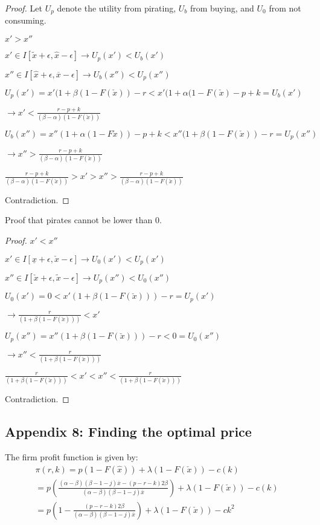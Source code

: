 \documentclass{article}
\begin{document}
\begin{proof}
Let $U_p$ denote the utility from pirating, $U_b$ from buying, and $U_0$ from not consuming.

$x'>x''$

$x' \in I[\tilde{x}+\epsilon,\hat{x}-\epsilon] \rightarrow U_p(x')<U_b(x')$ 

$x'' \in I[\hat{x}+\epsilon,\overline{x}-\epsilon] \rightarrow U_b(x'')<U_p(x'')$ 

$U_p(x')=x'(1+\beta(1-F(\check{x}))-r< x'(1+\alpha(1-F(\check{x})-p + k = U_b(x') $

$\rightarrow x' < \frac{r-p+k}{(\beta-\alpha)(1-F(\check{x}))}$

$U_b(x'')=x''(1+\alpha(1-F\check{x}))-p+k < x''(1+\beta(1-F(\check{x}))-r = U_p(x'') $

$\rightarrow x'' > \frac{r-p+k}{(\beta-\alpha)(1-F(\check{x}))}$

$\frac{r-p+k}{(\beta-\alpha)(1-F(\check{x}))}>x'>x''>\frac{r-p+k}{(\beta-\alpha)(1-F(\check{x}))}$

Contradiction. 
\end{proof}

Proof that pirates cannot be lower than 0. 
\begin{proof}
$x'<x''$

$x' \in I[\underline{x} + \epsilon, \check{x}-\epsilon] 
\rightarrow U_0(x')<U_p(x')$ 

$x'' \in I[\check{x}+\epsilon,\tilde{x} -\epsilon]
\rightarrow U_p(x'')<U_0(x'')$  

$U_0(x')=0<x'(1+\beta(1-F(\check{x})))-r =U_p(x')$

$\rightarrow \frac{r}{(1+\beta(1-F(\check{x})))}<x'$

$U_p(x'')=x''(1+\beta(1-F(\check{x})))-r<0=U_0(x'')$

$\rightarrow x''<\frac{r}{(1+\beta(1-F(\check{x})))}$

$\frac{r}{(1+\beta(1-F(\check{x})))}<x'<x''<\frac{r}{(1+\beta(1-F(\check{x})))}$

Contradiction. 
\end{proof}



\subsection{Appendix 8: Finding the optimal price}

The firm profit function is given by:
\[
\begin{array}{ll}
\pi(r,k) 
=p(1-F(\hat{x})) + \lambda (1-F(\check{x}) )- c(k) \\
=p(\frac{(\alpha - \beta) ( \beta  - 1 - j) \overline{x} - (p-r-k)2 \beta}{(\alpha - \beta) ( \beta  - 1 - j) \overline{x} }) + \lambda (1-F(\check{x}) )- c(k) \\
= p(1 - \frac{(p-r-k)2 \beta}{(\alpha - \beta) ( \beta  - 1 - j) \overline{x} }) + \lambda (1-F(\check{x}) )- ck^2 \\
\end{array}
\]
\end{document}
